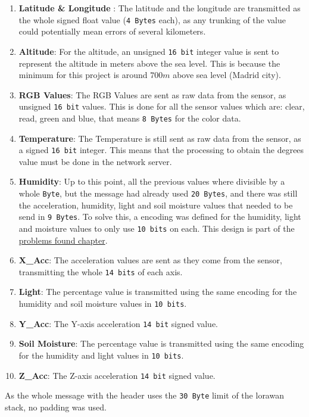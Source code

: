 \begin{enumerate}
    \item \textbf{Latitude \& Longitude }: The latitude and the longitude are transmitted as the whole signed float value (\texttt{4 Bytes} each), as any trunking of the value could potentially mean errors of several kilometers.
    \item \textbf{Altitude}: For the altitude, an unsigned \texttt{16 bit} integer value is sent to represent the altitude in meters above the sea level. This is because the minimum for this project is around $700m$ above sea level (Madrid city).
    \item \textbf{RGB Values}: The RGB Values are sent as raw data from the sensor, as unsigned \texttt{16 bit} values. This is done for all the sensor values which are: clear, read, green and blue, that means \texttt{8 Bytes} for the color data.
    \item \textbf{Temperature}: The Temperature is still sent as raw data from the sensor, as a signed \texttt{16 bit} integer. This means that the processing to obtain the degrees value must be done in the network server.
    \item \textbf{Humidity}: Up to this point, all the previous values where divisible by a whole \texttt{Byte}, but the message had already used \texttt{20 Bytes}, and there was still the acceleration, humidity, light and soil moisture values that needed to be 
    send in \texttt{9 Bytes}. To solve this, a encoding was defined for the humidity, light and moisture values to only use \texttt{10 bits} on each. This design is part of the \hyperref[problems]{problems found chapter}.
    \item \textbf{X\_Acc}: The acceleration values are sent as they come from the sensor, transmitting the whole \texttt{14 bits} of each axis.
    \item \textbf{Light}: The percentage value is transmitted using the same encoding for the humidity and soil moisture values in \texttt{10 bits}.
    \item \textbf{Y\_Acc}: The Y-axis acceleration \texttt{14 bit} signed value.
    \item \textbf{Soil Moisture}: The percentage value is transmitted using the same encoding for the humidity and light values in \texttt{10 bits}.
    \item \textbf{Z\_Acc}: The Z-axis acceleration \texttt{14 bit} signed value.
\end{enumerate}

As the whole message with the header uses the \texttt{30 Byte} limit of the \acrshort{lorawan} stack, no padding was used.

